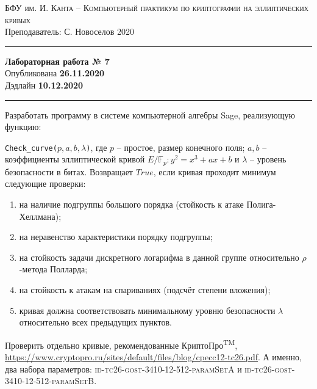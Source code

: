 \documentclass[11pt]{exam}
\theoremstyle{definition}
\begin{document}
	
	{\noindent
		\textsc{БФУ им. И. Канта -- Компьютерный практикум по криптографии на эллиптических кривых }\\[5pt]
		Преподаватель: {С. Новоселов}   \hfill{2020\\}
	\hrule
	\begin{center}
		{\LARGE\textbf{
				Лабораторная работа № 7 \\[5pt]
		}} 
			Опубликована \textbf{26.11.2020} \\[5pt] 
			Дэдлайн \textbf{10.12.2020}
		
	\end{center}
	\hrule \vspace{5mm}
	
	\thispagestyle{empty}
	
	Разработать программу в системе компьютерной алгебры Sage, реализующую функцию:
    
        \texttt{Check\_curve($p, a, b, \lambda$)}, где $p$ -- простое, размер конечного поля; $a, b$ -- коэффициенты эллиптической кривой $E/\mathbb{F}_p: y^2 = x^3 + a x + b$ и  $\lambda$ -- уровень безопасности в битах. Возвращает $True$, если кривая проходит минимум следующие проверки:
        \begin{enumerate}
            \item на наличие подгруппы большого порядка (стойкость к атаке Полига-Хеллмана);
            \item на неравенство характеристики порядку подгруппы;
            \item на стойкость задачи дискретного логарифма в данной группе относительно $\rho$-метода Полларда;
            \item на стойкость к атакам на спариваниях (подсчёт степени вложения);
            \item кривая должна соответствовать минимальному уровню безопасности $\lambda$ относительно всех предыдущих пунктов.
        \end{enumerate}
    
    Проверить отдельно кривые, рекомендованные КриптоПро\textsuperscript{TM}, \url{https://www.cryptopro.ru/sites/default/files/blog/cpecc12-tc26.pdf}. А именно, два набора параметров: \textsc{ id-tc26-gost-3410-12-512-paramSetA} и \textsc{id-tc26-gost-3410-12-512-paramSetB}.
    
    
\normalsize
}
\end{document}
